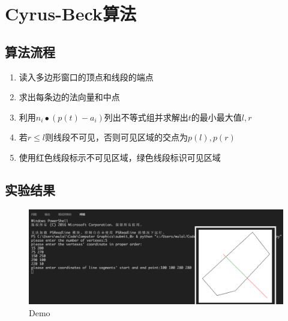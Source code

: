 \documentclass[11pt,UTF8]{article}
\begin{document}
\section{Cyrus-Beck算法}
\subsection{算法流程}
	\begin{enumerate}
		\item 读入多边形窗口的顶点和线段的端点
		\item 求出每条边的法向量和中点
		\item 利用$n_i \bullet (p(t) - a_i)$列出不等式组并求解出$t$的最小最大值$l,r$
		\item 若$r \le l$则线段不可见，否则可见区域的交点为$p(l), p(r)$
		\item 使用红色线段标示不可见区域，绿色线段标识可见区域
	\end{enumerate}
\subsection{实验结果}
	\begin{figure}[H]
		\centering
		\includegraphics[width=\textwidth]{demo6.png}
		\caption{Demo}\label{results}
	\end{figure}
\end{document}
